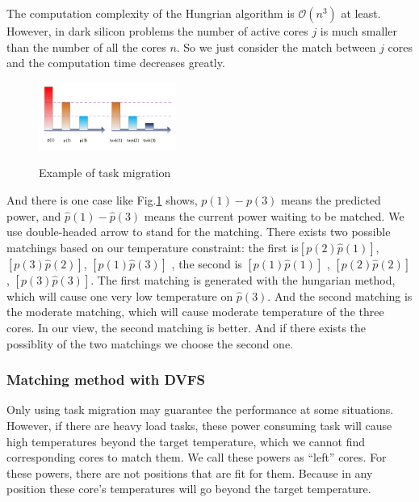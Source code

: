The computation complexity of the Hungrian algorithm is $\mathcal{O} (n^{3})$ at least. However, in dark silicon problems the number of active cores $j$ is much smaller than the number of all the cores $n$. So we just consider the match between $j$ cores and the computation time decreases greatly. 







\begin{figure}
  \centering
     {
       \includegraphics[width=0.4\textwidth]{fig/moderate}
     }
     \caption{Example of task migration}\label{moderate}
\end{figure}
 And there is one case like Fig.\ref{moderate} shows, $p(1)-p(3)$ means the predicted power, and $\hat{p}(1)-\hat{p}(3)$ means the current power waiting to be matched. We use double-headed arrow to stand for the matching. There exists two possible matchings based on our temperature constraint: the first is$[p(2) \hat{p}(1)]$, $[p(3) \hat{p}(2)]$, $[p(1) \hat{p}(3)]$ , the second is $[p(1) \hat{p}(1)]$ , $[p(2) \hat{p}(2)]$ , $[p(3) \hat{p}(3)]$. The first matching is generated with the hungarian method, which will cause one very low temperature on $\hat{p}(3)$. And the second matching is the moderate matching, which will cause moderate temperature of the three cores. In our view, the second matching is better. And if there exists the possiblity of the two matchings we choose the second one.
 
\subsubsection{Matching method with DVFS}

Only using task migration may guarantee the performance at some situations. However, if there are heavy load tasks, these power consuming task will cause high temperatures beyond the target temperature, which we cannot find corresponding cores to match them. We call these powers as ``left'' cores. For these powers, there are not positions that are fit for them. Because in any position these core's temperatures will go beyond the target temperature.


